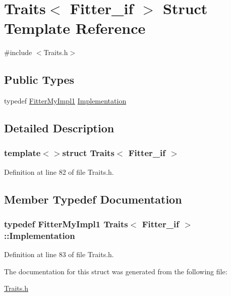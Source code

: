 \hypertarget{struct_traits_3_01_fitter__if_01_4}{\section{Traits$<$ Fitter\-\_\-if $>$ Struct Template Reference}
\label{struct_traits_3_01_fitter__if_01_4}
}


{\ttfamily \#include $<$Traits.\-h$>$}

\subsection*{Public Types}
\begin{DoxyCompactItemize}
\item 
typedef \hyperlink{class_fitter_my_impl1}{Fitter\-My\-Impl1} \hyperlink{struct_traits_3_01_fitter__if_01_4_ae583860c62ded7016b4d038d17b9b480}{Implementation}
\end{DoxyCompactItemize}


\subsection{Detailed Description}
\subsubsection*{template$<$$>$struct Traits$<$ Fitter\-\_\-if $>$}



Definition at line 82 of file Traits.\-h.



\subsection{Member Typedef Documentation}
\hypertarget{struct_traits_3_01_fitter__if_01_4_ae583860c62ded7016b4d038d17b9b480}{
\subsubsection[{Implementation}]{\setlength{\rightskip}{0pt plus 5cm}typedef {\bf Fitter\-My\-Impl1} {\bf Traits}$<$ {\bf Fitter\-\_\-if} $>$\-::{\bf Implementation}}}\label{struct_traits_3_01_fitter__if_01_4_ae583860c62ded7016b4d038d17b9b480}


Definition at line 83 of file Traits.\-h.



The documentation for this struct was generated from the following file\-:\begin{DoxyCompactItemize}
\item 
\hyperlink{_traits_8h}{Traits.\-h}\end{DoxyCompactItemize}

